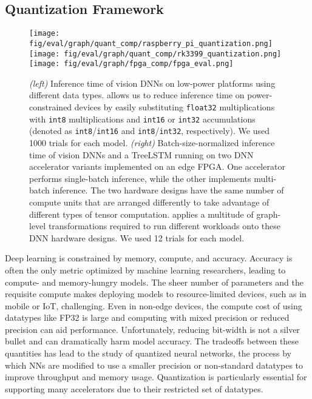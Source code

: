 \subsection{Quantization Framework}
\label{sec:quant}

\begin{figure*}[htbp!]
  \centering
  \texttt{[image: fig/eval/graph/quant\_comp/raspberry\_pi\_quantization.png]}
  \hspace{-0.075in}
  \texttt{[image: fig/eval/graph/quant\_comp/rk3399\_quantization.png]}
  \texttt{[image: fig/eval/graph/fpga\_comp/fpga\_eval.png]}
  \caption{\textmd{
    \textit{(left)} Inference time of vision DNNs on low-power platforms using
      different data types.
    \relay allows us to reduce inference time on power-constrained devices by
      easily substituting \texttt{float32} multiplications with \texttt{int8}
      multiplications and \texttt{int16} or \texttt{int32} accumulations (denoted
      as \texttt{int8}/\texttt{int16} and \texttt{int8}/\texttt{int32}, respectively).
    We used 1000 trials for each model.
    \textit{(right)}
    Batch-size-normalized inference time of vision DNNs and a TreeLSTM running on two DNN accelerator variants implemented on an edge FPGA.
    One accelerator performs single-batch inference, while the other implements multi-batch inference.
    The two hardware designs have the same number of compute units that are arranged differently to take advantage of different types of tensor computation.
    \relay applies a multitude of graph-level transformations required to run different workloads onto these DNN hardware designs.
    We used 12 trials for each model.
  }}
  \label{fig:portability-eval}
\end{figure*}

Deep learning is constrained by memory, compute, and accuracy.
Accuracy is often the only metric optimized by machine learning
  researchers, leading to compute- and memory-hungry models.
The sheer number of parameters and the requisite compute
  makes deploying models to resource-limited devices,
  such as in mobile or IoT, challenging.
Even in non-edge devices, the compute cost of using
  datatypes like FP32 is large and computing with mixed precision
  or reduced precision can aid performance.
Unfortunately, reducing bit-width is not a silver bullet and
  can dramatically harm model accuracy.
The tradeoffs between these quantities has lead to the study of quantized neural networks,
  the process by which NNs are modified to use a smaller precision
  or non-standard datatypes to improve throughput and memory usage.
Quantization is particularly essential for supporting many accelerators due to
  their restricted set of datatypes.

